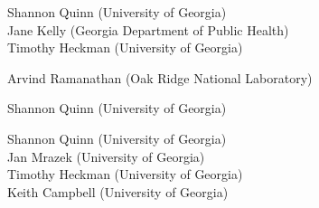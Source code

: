 Shannon Quinn (University of Georgia) \\
Jane Kelly (Georgia Department of Public Health) \\
Timothy Heckman (University of Georgia)

Arvind Ramanathan (Oak Ridge National Laboratory)

Shannon Quinn (University of Georgia)

Shannon Quinn (University of Georgia) \\
Jan Mrazek (University of Georgia) \\
Timothy Heckman (University of Georgia) \\
Keith Campbell (University of Georgia)




